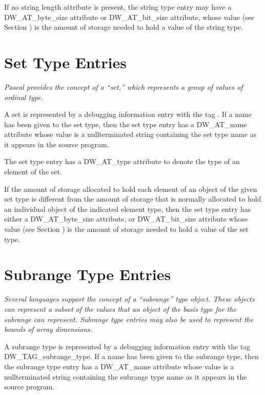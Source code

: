 If no string length attribute is present, the string type
entry may have a DW\_AT\_byte\_size attribute or DW\_AT\_bit\_size
attribute, whose value 
(see Section ) 
is the amount of
storage needed to hold a value of the string type.


\section{Set Type Entries}
\label{chap:settypeentries}

\textit{Pascal provides the concept of a “set,” which represents
a group of values of ordinal type.}

A set is represented by a debugging information entry with
the tag . 
If a name has been given to the
set type, then the set type entry has a DW\_AT\_name attribute
whose value is a null\dash terminated string containing the
set type name as it appears in the source program.

The set type entry has a DW\_AT\_type attribute to denote the
type of an element of the set.

If the amount of storage allocated to hold each element of an
object of the given set type is different from the amount of
storage that is normally allocated to hold an individual object
of the indicated element type, then the set type entry has
either a DW\_AT\_byte\_size attribute, or DW\_AT\_bit\_size attribute
whose value (see Section ) is
the amount of storage needed to hold a value of the set type.


\section{Subrange Type Entries}
\label{chap:subrangetypeentries}

\textit{Several languages support the concept of a ``subrange''
type object. These objects can represent a subset of the
values that an object of the basis type for the subrange can
represent. Subrange type entries may also be used to represent
the bounds of array dimensions.}

A subrange type is represented by a debugging information
entry with the tag DW\_TAG\_subrange\_type. If a name has been
given to the subrange type, then the subrange type entry
has a DW\_AT\_name attribute whose value is a null\dash terminated
string containing the subrange type name as it appears in
the source program.

